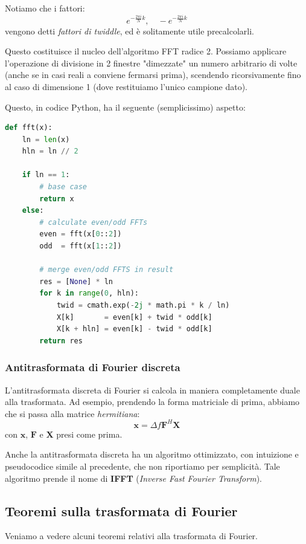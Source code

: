 \documentclass[a4paper,11pt]{article}
\begin{document}
Notiamo che i fattori:
$$
e^{- \frac{2\pi i}{N} k}, \quad -e^{- \frac{2\pi i}{N} k}
$$
vengono detti \textit{fattori di twiddle}, ed è solitamente utile precalcolarli.

Questo costituisce il nucleo dell'algoritmo FFT radice 2. Possiamo applicare l'operazione di divisione in 2 finestre "dimezzate" un numero arbitrario di volte (anche se in casi reali a conviene fermarsi prima), scendendo ricorsivamente fino al caso di dimensione 1 (dove restituiamo l'unico campione dato).

Questo, in codice Python, ha il seguente (semplicissimo) aspetto:
\begin{lstlisting}[language=python, style=codestyle]	
def fft(x):
    ln = len(x)
    hln = ln // 2

    if ln == 1:
        # base case 
        return x
    else:
        # calculate even/odd FFTs
        even = fft(x[0::2])
        odd  = fft(x[1::2])

        # merge even/odd FFTS in result
        res = [None] * ln 
        for k in range(0, hln):
            twid = cmath.exp(-2j * math.pi * k / ln)
            X[k]       = even[k] + twid * odd[k] 
            X[k + hln] = even[k] - twid * odd[k] 
        return res
\end{lstlisting}

\subsubsection{Antitrasformata di Fourier discreta}
L'antitrasformata discreta di Fourier si calcola in maniera completamente duale alla trasformata. Ad esempio, prendendo la forma matriciale di prima, abbiamo che si passa alla matrice \textit{hermitiana}:
$$
\mathbf{x} = \Delta f \mathbf{F}^H \mathbf{X}
$$
con $\mathbf{x}$, $\mathbf{F}$ e $\mathbf{X}$ presi come prima. 

Anche la antitrasformata discreta ha un algoritmo ottimizzato, con intuizione e pseudocodice simile al precedente, che non riportiamo per semplicità. Tale algoritmo prende il nome di \textbf{IFFT} (\textit{Inverse Fast Fourier Transform}).

\subsection{Teoremi sulla trasformata di Fourier}
Veniamo a vedere alcuni teoremi relativi alla trasformata di Fourier.
\end{document}
